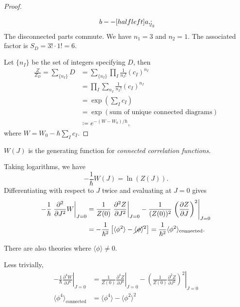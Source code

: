 \begin{proof}
\begin{example}[]
\begin{equation}
{\begin{gathered}
{					  b -- [half left] a,
					};
				      \end{gathered}}_{\mathclap{c_2}}
    \end{equation}
    The disconnected parts commute. We have $n_1 = 3$ and $n_2 = 1$. The associated factor is $S_D = 3!  \cdot 1! = 6$.
  \end{example}
  Let $\{n_I\}$ be the set of integers specifying $D$, then
  \begin{align}
    \frac{Z}{Z_D} = \sum_{\{n_I\}} D
		  &= \sum_{\{n_I\}} \prod_I \frac{1}{n_I!} (c_I)^{n_I} \\
		  &= \prod_{I} \sum_{n_I} \frac{1}{n_I!} (c_I)^{n_I} \\
		  &= \exp(\sum_I c_I) \\
		  &= \exp( \text{sum of unique connected diagrams} ) \\
		  &\coloneqq e^{-(W - W_0) / \hbar},
  \end{align}
  where $W = W_0 - \hbar \sum_{I} c_I$.
\end{proof}

\begin{claim}
  $W(J)$ is the generating function for \emph{connected correlation functions}.
\end{claim}
\begin{example}
  Taking logarithms, we have
  \begin{equation}
    -\frac{1}{\hbar} W(J) = \ln (Z(J)).
  \end{equation}
  Differentiating with respect to $J$  twice and evaluating at $J = 0$ gives
   \begin{align}
     -\frac{1}{\hbar} \left.\frac{\partial^2}{\partial J^2} W \right\rvert_{J = 0} &= \frac{1}{Z(0)} \left.\frac{\partial^2 Z}{\partial J^2}\right\rvert_{J = 0} - \frac{1}{(Z(0))^2} \left.\left( \frac{\partial Z}{\partial J} \right)^2 \right\rvert_{J =0} \\
     &= -\frac{1}{\hbar^2} \left[ \langle \phi^2 \rangle - \cancel{\langle \phi \rangle}^2 \right] = \frac{1}{\hbar^2} \langle \phi^2 \rangle_{\text{connected}}.
  \end{align}
  \begin{leftbar}
    There are also theories where $\langle \phi \rangle \neq 0$.
  \end{leftbar}
  Less trivially, 
  \begin{align}
    -\frac{1}{\hbar} \left. \frac{\partial^4 W}{\partial J^4} \right\rvert_{J = 0} &= \frac{1}{Z(0)} \left. \frac{\partial^4 Z}{\partial J^4}\right\rvert_{J = 0} - \left.\left( \frac{1}{Z(0)} \frac{\partial^2 Z}{\partial J^2} \right)^2 \right\rvert_{J = 0} \\
    \langle \phi^4 \rangle_{\text{connected}} &= \langle \phi^4 \rangle - \langle \phi^2 \rangle^2
  \end{align}
\end{example}

